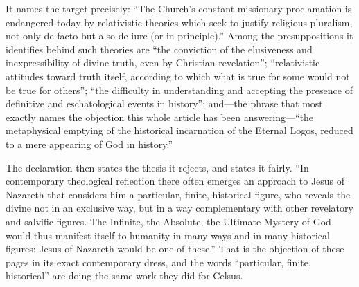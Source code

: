 It names the target precisely: ``The Church's constant missionary proclamation is endangered today by relativistic theories which seek to justify religious pluralism, not only de facto but also de iure (or in principle).'' Among the presuppositions it identifies behind such theories are ``the conviction of the elusiveness and inexpressibility of divine truth, even by Christian revelation''; ``relativistic attitudes toward truth itself, according to which what is true for some would not be true for others''; ``the difficulty in understanding and accepting the presence of definitive and eschatological events in history''; and---the phrase that most exactly names the objection this whole article has been answering---``the metaphysical emptying of the historical incarnation of the Eternal Logos, reduced to a mere appearing of God in history.''

The declaration then states the thesis it rejects, and states it fairly. ``In contemporary theological reflection there often emerges an approach to Jesus of Nazareth that considers him a particular, finite, historical figure, who reveals the divine not in an exclusive way, but in a way complementary with other revelatory and salvific figures. The Infinite, the Absolute, the Ultimate Mystery of God would thus manifest itself to humanity in many ways and in many historical figures: Jesus of Nazareth would be one of these.'' That is the objection of these pages in its exact contemporary dress, and the words ``particular, finite, historical'' are doing the same work they did for Celsus.

